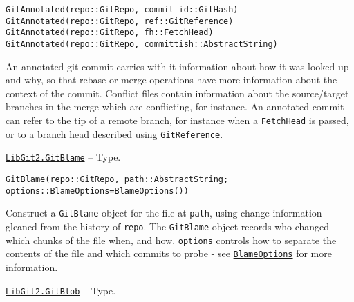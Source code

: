 \begin{adjustwidth}{2em}{0pt}


\begin{verbatim}
GitAnnotated(repo::GitRepo, commit_id::GitHash)
GitAnnotated(repo::GitRepo, ref::GitReference)
GitAnnotated(repo::GitRepo, fh::FetchHead)
GitAnnotated(repo::GitRepo, committish::AbstractString)
\end{verbatim}

An annotated git commit carries with it information about how it was looked up and why, so that rebase or merge operations have more information about the context of the commit. Conflict files contain information about the source/target branches in the merge which are conflicting, for instance. An annotated commit can refer to the tip of a remote branch, for instance when a \hyperlink{17806809481919147110}{\texttt{FetchHead}} is passed, or to a branch head described using \texttt{GitReference}.



\end{adjustwidth}
\hypertarget{11166114255561117709}{}
\hyperlink{11166114255561117709}{\texttt{LibGit2.GitBlame}}  -- {Type.}

\begin{adjustwidth}{2em}{0pt}


\begin{verbatim}
GitBlame(repo::GitRepo, path::AbstractString; options::BlameOptions=BlameOptions())
\end{verbatim}

Construct a \texttt{GitBlame} object for the file at \texttt{path}, using change information gleaned from the history of \texttt{repo}. The \texttt{GitBlame} object records who changed which chunks of the file when, and how. \texttt{options} controls how to separate the contents of the file and which commits to probe - see \hyperlink{13109557230915215869}{\texttt{BlameOptions}} for more information.



\end{adjustwidth}
\hypertarget{13272891135715880949}{}
\hyperlink{13272891135715880949}{\texttt{LibGit2.GitBlob}}  -- {Type.}

